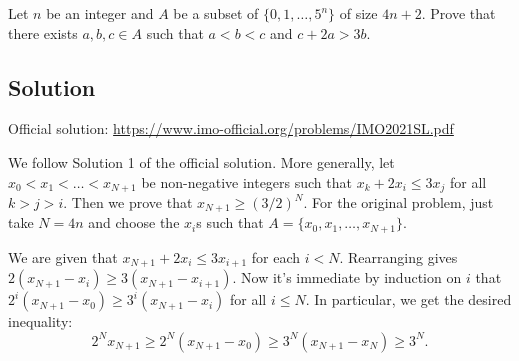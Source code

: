 Let $n$ be an integer and $A$ be a subset of $\{0, 1, \ldots, 5^n\}$ of size $4n + 2$.
Prove that there exists $a, b, c \in A$ such that $a < b < c$ and $c + 2a > 3b$.



\subsection*{Solution}

Official solution: \url{https://www.imo-official.org/problems/IMO2021SL.pdf}

We follow Solution 1 of the official solution.
More generally, let $x_0 < x_1 < \ldots < x_{N + 1}$ be non-negative integers such that $x_k + 2 x_i \leq 3 x_j$ for all $k > j > i$.
Then we prove that $x_{N + 1} \geq (3/2)^N$.
For the original problem, just take $N = 4n$ and choose the $x_i$s such that $A = \{x_0, x_1, \ldots, x_{N + 1}\}$.

We are given that $x_{N + 1} + 2 x_i \leq 3 x_{i + 1}$ for each $i < N$.
Rearranging gives $2 (x_{N + 1} - x_i) \geq 3 (x_{N + 1} - x_{i + 1})$.
Now it's immediate by induction on $i$ that $2^i (x_{N + 1} - x_0) \geq 3^i (x_{N + 1} - x_i)$ for all $i \leq N$.
In particular, we get the desired inequality:
\[ 2^N x_{N + 1} \geq 2^N (x_{N + 1} - x_0) \geq 3^N (x_{N + 1} - x_N) \geq 3^N. \]

